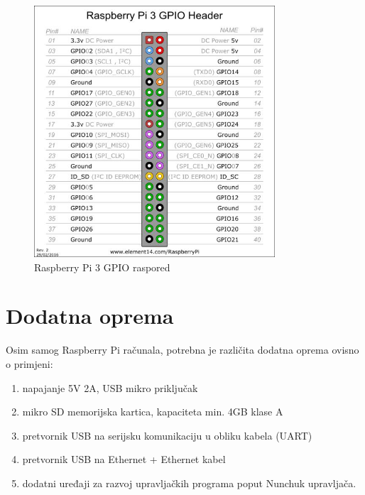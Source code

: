\documentclass[11pt]{article}
\begin{document}
\begin{figure}[h!]
	\centering
	\includegraphics[width=0.8\textwidth]{rpi-3-pins.jpg}
	\captionsetup{justification=centering}
	\caption{Raspberry Pi 3 GPIO raspored}
	\label{fig:rpi-gpio}
\end{figure}

\clearpage
\section{Dodatna oprema}
Osim samog Raspberry Pi računala, potrebna je različita dodatna oprema ovisno
 o primjeni:

\begin{enumerate}
	\item napajanje 5V 2A, USB mikro priključak
	\item mikro SD memorijska kartica, kapaciteta min. 4GB klase A
	\item pretvornik USB na serijsku komunikaciju u obliku kabela (UART)
	\item pretvornik USB na Ethernet + Ethernet kabel
	\item dodatni uređaji za razvoj upravljačkih programa poput Nunchuk
		 upravljača.
\end{enumerate}
\end{document}
